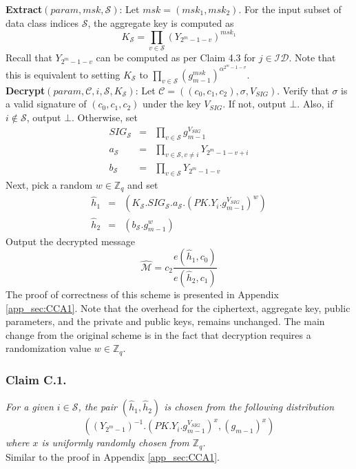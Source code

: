 \noindent \textbf{Extract}$(param,msk,\mathcal{S})$: Let $msk=(msk_1,msk_2)$. For the input subset of data class indices $\mathcal{S}$, the aggregate key is computed as 
\begin{equation}
 K_{\mathcal{S}} = \prod_{v\in\mathcal{S}}\left({Y_{2^m-1-v}}\right)^{msk_1}\nonumber
\end{equation} 
\noindent Recall that $Y_{2^m-1-v}$ can be computed as per Claim 4.3 for $j\in\mathcal{ID}$. Note that this is equivalent to setting $K_{\mathcal{S}}$ to $\prod_{v\in\mathcal{S}}{\left(g^{msk}_{m-1}\right)}^{\alpha^{2^m-1-v}}$.\\
 
\noindent \textbf{Decrypt}$(param,\mathcal{C},i,\mathcal{S},K_{\mathcal{S}})$: Let $\mathcal{C}=((c_0,c_1,c_2),\sigma,V_{SIG})$. Verify that $\sigma$ is a valid signature of $(c_0,c_1,c_2)$ under the key $V_{SIG}$. If not, output $\bot$. Also, if $i\notin\mathcal{S}$, output $\bot$. Otherwise, set 
\begin{eqnarray}
  SIG_{\mathcal{S}} &=& \prod_{v\in\mathcal{S}}g^{V_{SIG}}_{m-1}\nonumber\\
  a_{\mathcal{S}} &=& \prod_{v\in\mathcal{S},v\neq i}Y_{2^m-1-v+i}\nonumber\\
  b_{\mathcal{S}} &=& \prod_{v\in\mathcal{S}}Y_{2^m-1-v}\nonumber  
\end{eqnarray}
\noindent Next, pick a random $w\in \mathbb{Z}_q$ and set
 \begin{eqnarray}
  \hat{h}_1 &=& (K_{\mathcal{S}}.SIG_{\mathcal{S}}.a_{\mathcal{S}}.(PK.Y_i.g^{V_{SIG}}_{m-1})^w)\nonumber\\
  \hat{h}_2 &=& (b_{\mathcal{S}}.g^w_{m-1}) \nonumber
 \end{eqnarray}
 \noindent Output the decrypted message 
 \begin{equation}
  \hat{\mathcal{M}} = c_2\frac{{e}(\hat{h}_1,c_0)}{{e}(\hat{h}_2,c_1)}\nonumber
 \end{equation}
\noindent The proof of correctness of this scheme is presented in Appendix \ref{app_sec:CCA1}. Note that the overhead for the ciphertext, aggregate key, public parameters, and the private and public keys, remains unchanged. The main change from the original scheme is in the fact that decryption requires a randomization value $w\in\mathbb{Z}_q$.

\subsubsection{Claim C.1.} \textit{For a given $i\in\mathcal{S}$, the pair $(\hat{h}_1,\hat{h}_2)$ is chosen from the following distribution 
\begin{equation}
\left(\left({Y_{2^m-1}}\right)^{-1}.\left(PK.Y_i.g^{V_{SIG}}_{m-1}\right)^x,\left(g_{m-1}\right)^x\right)\nonumber
\end{equation}
\noindent where $x$ is uniformly randomly chosen from $\mathbb{Z}_q$.}\\
 Similar to the proof in Appendix \ref{app_sec:CCA1}.\\

